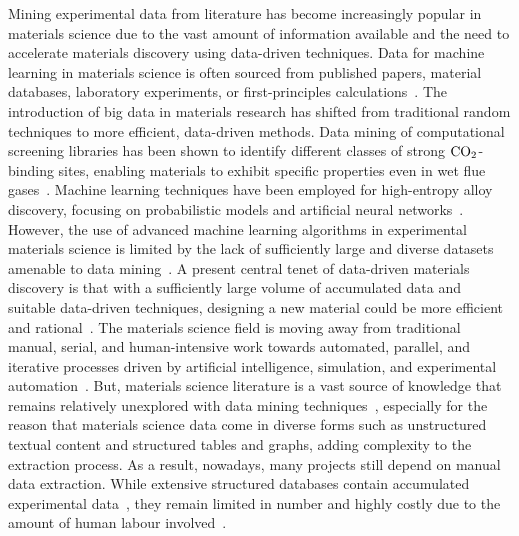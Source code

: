 Mining experimental data from literature has become increasingly popular in materials science due to the vast amount of information available and the need to accelerate materials discovery using data-driven techniques. Data for machine learning in materials science is often sourced from published papers, material databases, laboratory experiments, or first-principles calculations~\cite{xuSmallDataMachine2023}. The introduction of big data in materials research has shifted from traditional random techniques to more efficient, data-driven methods. Data mining of computational screening libraries has been shown to identify different classes of strong $\rm CO_{2}$-binding sites, enabling materials to exhibit specific properties even in wet flue gases~\cite{boyd2019data}. Machine learning techniques have been employed for high-entropy alloy discovery, focusing on probabilistic models and artificial neural networks~\cite{rao2022machine}. However, the use of advanced machine learning algorithms in experimental materials science is limited by the lack of sufficiently large and diverse datasets amenable to data mining~\cite{zakutayev2018open}. A present central tenet of data-driven materials discovery is that with a sufficiently large volume of accumulated data and suitable data-driven techniques, designing a new material could be more efficient and rational~\cite{huan2016polymer}. The materials science field is moving away from traditional manual, serial, and human-intensive work towards automated, parallel, and iterative processes driven by artificial intelligence, simulation, and experimental automation~\cite{pyzer2022accelerating, huber2020machine}. But, materials science literature is a vast source of knowledge that remains relatively unexplored with data mining techniques~\cite{park2021advances}, especially for the reason that materials science data come in diverse forms such as unstructured textual content and structured tables and graphs, adding complexity to the extraction process. As a result, nowadays, many projects still depend on manual data extraction. While extensive structured databases contain accumulated experimental data~\cite{chittambigdat2021}, they remain limited in number and highly costly due to the amount of human labour involved~\cite{madataug2020}.

